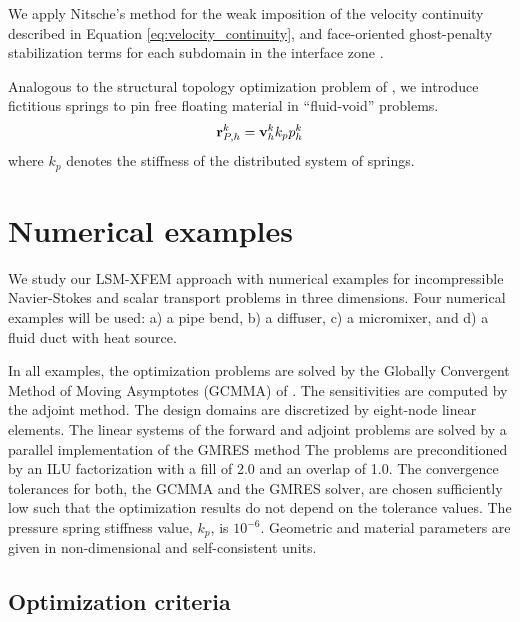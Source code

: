 We apply Nitsche's method \citep{Nitsche:75, Hansbo:05} for the weak imposition of the velocity continuity described in Equation \ref{eq:velocity_continuity}, and face-oriented ghost-penalty stabilization terms for each subdomain in the interface zone \citep{BH:12, SW:14}.

Analogous to the structural topology optimization problem of \citep{VM:14}, we introduce fictitious springs to pin free floating material in ``fluid-void'' problems.
%
\begin{equation}
	\centering
	\mathbf{r}^{k}_{P,h} = \mathbf{v}^{k}_{h} k_{p} p^{k}_{h}
\end{equation}
%
where $k_{p}$ denotes the stiffness of the distributed system of springs.


\section{Numerical examples}
\label{sec:numerical_examples}

We study our LSM-XFEM approach with numerical examples for incompressible Navier-Stokes and scalar transport problems in three dimensions. Four numerical examples will be used: a) a pipe bend, b) a diffuser, c) a micromixer, and d) a fluid duct with heat source.

In all examples, the optimization problems are solved by the Globally Convergent Method of Moving Asymptotes (GCMMA) of \citep{Svanberg:95, Svanberg:02}. The sensitivities are computed by the adjoint method. The design domains are discretized by eight-node linear elements. The linear systems of the forward and adjoint problems are solved by a parallel implementation of the GMRES method \citep{Trilinos:03} The problems are preconditioned by an ILU factorization with a fill of 2.0 and an overlap of 1.0. The convergence tolerances for both, the GCMMA and the GMRES solver, are chosen sufficiently low such that the optimization results do not depend on the tolerance values. The pressure spring stiffness value, $k_{p}$, is $10^{-6}$. Geometric and material parameters are
given in non-dimensional and self-consistent units.


\subsection{Optimization criteria}
\label{sec:optimization_criteria}

